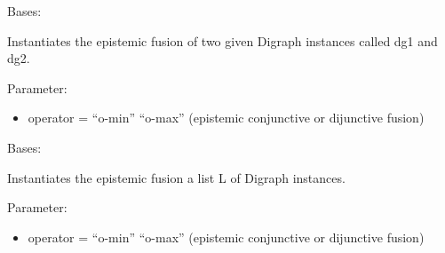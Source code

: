 \documentclass[letterpaper,10pt,english]{sphinxmanual}
\begin{document}

\begin{fulllineitems}
\label{techDoc:digraphs.FusionDigraph}
Bases: {\hyperref[techDoc:digraphs.Digraph]{\emph{}}}

Instantiates the epistemic fusion of two given Digraph instances
called dg1 and dg2.

Parameter:
\begin{itemize}
\item {} 
operator = ``o-min'' \textbar{} ``o-max'' (epistemic conjunctive or dijunctive fusion)

\end{itemize}

\end{fulllineitems}


\begin{fulllineitems}
\label{techDoc:digraphs.FusionLDigraph}
Bases: {\hyperref[techDoc:digraphs.Digraph]{\emph{}}}

Instantiates the epistemic fusion a list L of Digraph instances.

Parameter:
\begin{itemize}
\item {} 
operator = ``o-min'' \textbar{} ``o-max'' (epistemic conjunctive or dijunctive fusion)

\end{itemize}

\end{fulllineitems}

\end{document}
